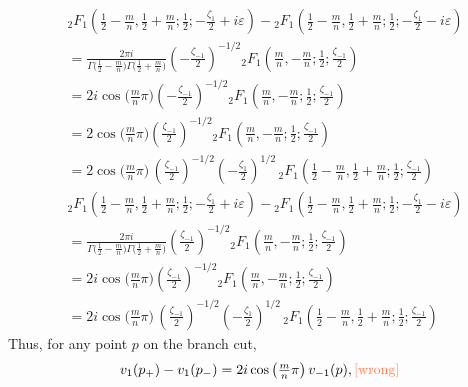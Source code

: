 \documentclass{article}
\theoremstyle{definition}
\theoremstyle{plain}
\newenvironment{todo}{\color{Coral}}{\color{black}}
\newenvironment{old}{\color{RoyalBlue}}{\color{black}}
\newenvironment{draft}{\color{SlateBlue}}{\color{black}}
\newenvironment{revised}{\color{DarkBlue}}{\color{black}}
\begin{document}
\begin{revised}
\begin{old}
\begin{align*}
&{}_2F_1\left(\frac{1}{2}-\frac{m}{n},\frac{1}{2}+\frac{m}{n};\frac{1}{2};-\frac{\zeta_1}{2}+i\varepsilon\right)-{}_2F_1\left(\frac{1}{2}-\frac{m}{n},\frac{1}{2}+\frac{m}{n};\frac{1}{2};-\frac{\zeta_1}{2}-i\varepsilon\right) \\
&=\frac{2\pi i}{\Gamma\big(\tfrac{1}{2}-\tfrac{m}{n}\big)\Gamma\big(\tfrac{1}{2}+\tfrac{m}{n}\big)} \left(-\frac{\zeta_{-1}}{2}\right)^{-1/2} {}_2F_1\left(\frac{m}{n},-\frac{m}{n};\frac{1}{2};\frac{\zeta_{-1}}{2}\right) \\
&=2 i\cos\big(\tfrac{m}{n}\pi\big) \left(-\frac{\zeta_{-1}}{2}\right)^{-1/2} {}_2F_1\left(\frac{m}{n},-\frac{m}{n};\frac{1}{2};\frac{\zeta_{-1}}{2}\right) \\
&=2\cos\big(\tfrac{m}{n}\pi\big) \left(\frac{\zeta_{-1}}{2}\right)^{-1/2} {}_2F_1\left(\frac{m}{n},-\frac{m}{n};\frac{1}{2};\frac{\zeta_{-1}}{2}\right) \\
&=2\cos\big(\tfrac{m}{n}\pi\big)\, \left(\frac{\zeta_{-1}}{2}\right)^{-1/2} \left(-\frac{\zeta_{1}}{2}\right)^{1/2}\, {}_2F_1\left(\frac{1}{2}-\frac{m}{n},\frac{1}{2}+\frac{m}{n};\frac{1}{2};\frac{\zeta_{-1}}{2}\right)
\end{align*}
\end{old}
\begin{align*}
&{}_2F_1\left(\frac{1}{2}-\frac{m}{n},\frac{1}{2}+\frac{m}{n};\frac{1}{2};-\frac{\zeta_1}{2}+i\varepsilon\right)-{}_2F_1\left(\frac{1}{2}-\frac{m}{n},\frac{1}{2}+\frac{m}{n};\frac{1}{2};-\frac{\zeta_1}{2}-i\varepsilon\right) \\
&=\frac{2\pi i}{\Gamma\big(\tfrac{1}{2}-\tfrac{m}{n}\big)\Gamma\big(\tfrac{1}{2}+\tfrac{m}{n}\big)} \left(\frac{\zeta_{-1}}{2}\right)^{-1/2} {}_2F_1\left(\frac{m}{n},-\frac{m}{n};\frac{1}{2};\frac{\zeta_{-1}}{2}\right) \\
&=2i\cos\big(\tfrac{m}{n}\pi\big) \left(\frac{\zeta_{-1}}{2}\right)^{-1/2} {}_2F_1\left(\frac{m}{n},-\frac{m}{n};\frac{1}{2};\frac{\zeta_{-1}}{2}\right) \\
&=2i\cos\big(\tfrac{m}{n}\pi\big)\, \left(\frac{\zeta_{-1}}{2}\right)^{-1/2} \left(-\frac{\zeta_{1}}{2}\right)^{1/2}\, {}_2F_1\left(\frac{1}{2}-\frac{m}{n},\frac{1}{2}+\frac{m}{n};\frac{1}{2};\frac{\zeta_{-1}}{2}\right)
\end{align*}
Thus, for any point $p$ on the branch cut,
\begin{draft}
\begin{equation}\label{resurgent-relation-1}
v_1(p_+) - v_1(p_-)=2i \cos\big(\tfrac{m}{n}\pi\big)\,v_{-1}(p), \begin{todo}\text{[wrong]}\end{todo}

\end{equation}
\end{draft}
\end{revised}
\end{document}
